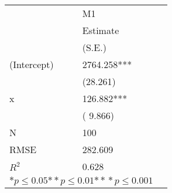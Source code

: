 \begin{tabular}{@{}l*{2}{l}@{}}
\hline
  &\multicolumn{1}{l}{M1  }\tabularnewline
 &\multicolumn{1}{l}{Estimate}\tabularnewline
 &\multicolumn{1}{l}{(S.E.)}\tabularnewline
 \hline
 \hline
  (Intercept) & 2764.258*** \tabularnewline
 &(28.261)\tabularnewline
  x & 126.882*** \tabularnewline
 &( 9.866)\tabularnewline
 \hline
 N&\multicolumn{1}{l}{100} \tabularnewline
 RMSE&282.609\tabularnewline
 $R^2$&0.628\tabularnewline
 \hline
\hline
 
 \multicolumn{2}{l}{  ${*  p}\le 0.05$${*\!\!*  p}\le 0.01$${*\!\!*\!\!*  p}\le 0.001$}\tabularnewline
 \end{tabular}